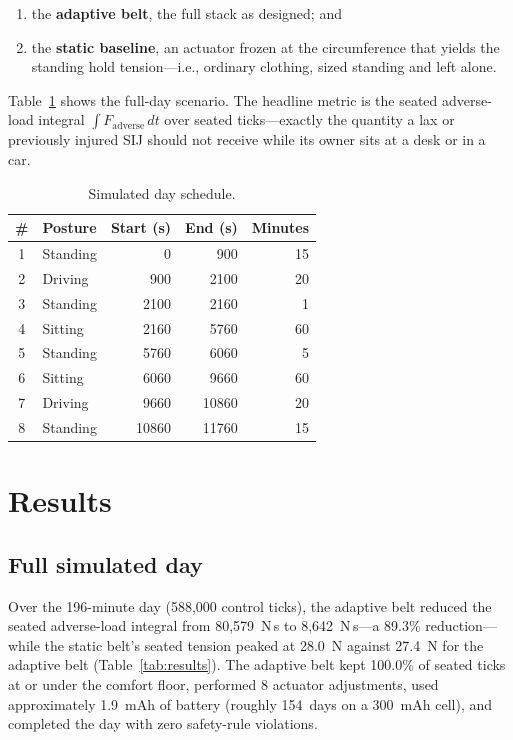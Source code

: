 \documentclass[11pt]{article}
\begin{document}
\begin{enumerate}
\item the \textbf{adaptive belt}, the full stack as designed; and
\item the \textbf{static baseline}, an actuator frozen at the
circumference that yields the standing hold tension---i.e., ordinary
clothing, sized standing and left alone.
\end{enumerate}

Table~\ref{tab:day} shows the full-day scenario. The headline metric is
the seated adverse-load integral $\int F_{\text{adverse}}\,dt$ over
seated ticks---exactly the quantity a lax or previously injured SIJ
should not receive while its owner sits at a desk or in a car.

\begin{table}[t]
\centering
\caption{Simulated day schedule.}
\label{tab:day}
\begin{tabular}{clrrr}
\toprule
\# & Posture & Start (s) & End (s) & Minutes \\
\midrule
1 & Standing & 0 & 900 & 15 \\
2 & Driving & 900 & 2100 & 20 \\
3 & Standing & 2100 & 2160 & 1 \\
4 & Sitting & 2160 & 5760 & 60 \\
5 & Standing & 5760 & 6060 & 5 \\
6 & Sitting & 6060 & 9660 & 60 \\
7 & Driving & 9660 & 10860 & 20 \\
8 & Standing & 10860 & 11760 & 15 \\
\bottomrule
\end{tabular}
\end{table}

\section{Results}
\subsection{Full simulated day}
Over the 196-minute day (588,000 control ticks), the adaptive
belt reduced the seated adverse-load integral from
80,579~N\,s to 8,642~N\,s---a 89.3\%
reduction---while the static belt's seated tension peaked at
28.0~N against 27.4~N for the adaptive belt
(Table~\ref{tab:results}). The adaptive belt kept
100.0\% of seated ticks at or under the comfort floor, performed
8 actuator adjustments, used approximately 1.9~mAh of
battery (roughly 154~days on a 300~mAh cell), and completed
the day with zero safety-rule violations.
\end{document}
